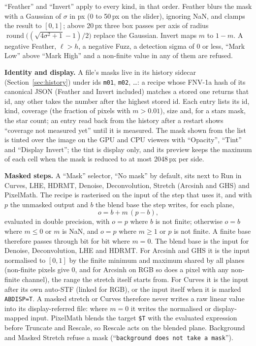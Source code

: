 \documentclass[11pt,a4paper]{article}
\newcommand{\code}[1]{\texttt{\small #1}}
\begin{document}
    ``Feather'' and ``Invert'' apply to every kind, in that order. Feather blurs the mask with a Gaussian of $\sigma$ in px (0 to 50\,px on the slider), ignoring NaN, and clamps the result to $[0, 1]$; above 20\,px three box passes per axis of radius $\operatorname{round}\big((\sqrt{4\sigma^2 + 1} - 1)/2\big)$ replace the Gaussian. Invert maps $m$ to $1 - m$. A negative Feather, $\ell > h$, a negative Fuzz, a detection sigma of 0 or less, ``Mark Low'' above ``Mark High'' and a non-finite value in any of them are refused.

    \textbf{Identity and display.} A file's masks live in its history sidecar (Section~\ref{sec:history}) under ids \code{m01}, \code{m02}, \ldots: a recipe whose FNV-1a hash of its canonical JSON (Feather and Invert included) matches a stored one returns that id, any other takes the number after the highest stored id. Each entry lists its id, kind, coverage (the fraction of pixels with $m > 0.01$), size and, for a stars mask, the star count; an entry read back from the history after a restart shows ``coverage not measured yet'' until it is measured. The mask shown from the list is tinted over the image on the GPU and CPU viewers with ``Opacity'', ``Tint'' and ``Display Invert''; the tint is display only, and its preview keeps the maximum of each cell when the mask is reduced to at most 2048\,px per side.

    \textbf{Masked steps.} A ``Mask'' selector, ``No mask'' by default, sits next to Run in Curves, LHE, HDRMT, Denoise, Deconvolution, Stretch (Arcsinh and GHS) and PixelMath. The recipe is rasterised on the input of the step that uses it, and with $p$ the unmasked output and $b$ the blend base the step writes, for each plane,
    \begin{equation}
        o = b + m\,(p - b),
    \end{equation}
    evaluated in double precision, with $o = p$ where $b$ is not finite; otherwise $o = b$ where $m \le 0$ or $m$ is NaN, and $o = p$ where $m \ge 1$ or $p$ is not finite. A finite base therefore passes through bit for bit where $m = 0$. The blend base is the input for Denoise, Deconvolution, LHE and HDRMT. For Arcsinh and GHS it is the input normalised to $[0, 1]$ by the finite minimum and maximum shared by all planes (non-finite pixels give 0, and for Arcsinh on RGB so does a pixel with any non-finite channel), the range the stretch itself starts from. For Curves it is the input after its own auto-STF (linked for RGB), or the input itself when it is marked \code{ABDISP=T}. A masked stretch or Curves therefore never writes a raw linear value into its display-referred file: where $m = 0$ it writes the normalised or display-mapped input. PixelMath blends the target \code{\$T} with the evaluated expression before Truncate and Rescale, so Rescale acts on the blended plane. Background and Masked Stretch refuse a mask (``\code{background does not take a mask}'').
\end{document}
